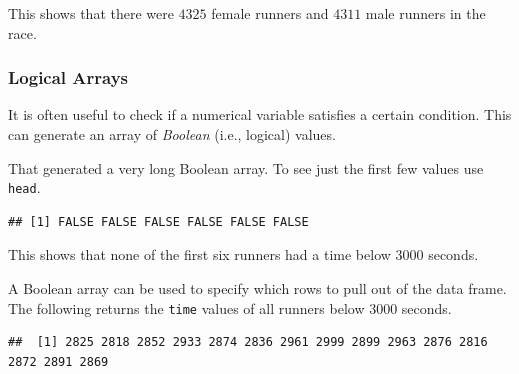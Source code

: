 \documentclass[
]{article}
\newenvironment{Shaded}{\begin{snugshade}}{\end{snugshade}}
\newcommand{\DecValTok}[1]{\textcolor[rgb]{0.00,0.00,0.81}{#1}}
\newcommand{\FunctionTok}[1]{\textcolor[rgb]{0.13,0.29,0.53}{\textbf{#1}}}
\newcommand{\NormalTok}[1]{#1}
\newcommand{\SpecialCharTok}[1]{\textcolor[rgb]{0.81,0.36,0.00}{\textbf{#1}}}
\newcommand{\StringTok}[1]{\textcolor[rgb]{0.31,0.60,0.02}{#1}}
\newcounter{none} %
\begin{document}
This shows that there were \(4325\) female runners and \(4311\) male
runners in the race.

\subsubsection{Logical Arrays}\label{logical-arrays}

It is often useful to check if a numerical variable satisfies a certain
condition. This can generate an array of \emph{Boolean} (i.e., logical)
values.

\begin{Shaded}
\end{Shaded}

That generated a very long Boolean array. To see just the first few
values use \texttt{head}.

\begin{Shaded}
\end{Shaded}

\begin{verbatim}
## [1] FALSE FALSE FALSE FALSE FALSE FALSE
\end{verbatim}

This shows that none of the first six runners had a time below 3000
seconds.

A Boolean array can be used to specify which rows to pull out of the
data frame. The following returns the \texttt{time} values of all
runners below 3000 seconds.

\begin{Shaded}
\end{Shaded}

\begin{verbatim}
##  [1] 2825 2818 2852 2933 2874 2836 2961 2999 2899 2963 2876 2816 2872 2891 2869
\end{verbatim}
\end{document}
